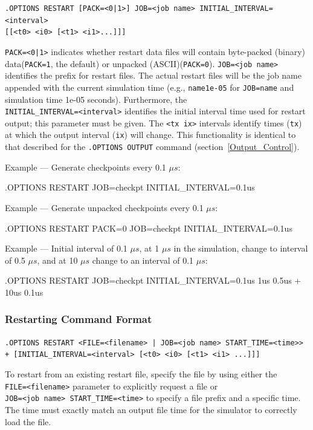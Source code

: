 \begin{XyceItemize}
\item \verb+.OPTIONS RESTART [PACK=<0|1>] JOB=<job name> INITIAL_INTERVAL=<interval>+ \\
  \verb+[[<t0> <i0> [<t1> <i1>...]]]+

  \texttt{PACK=<0|1>} indicates whether restart data files will contain byte-packed (binary) data(\texttt{PACK=1}, the default) or unpacked (ASCII)(\texttt{PACK=0}).
  \texttt{JOB=<job name>} identifies the prefix for restart files.  The actual restart files will be the job name appended with the current simulation time (e.g., \texttt{name1e-05} for \texttt{JOB=name} and simulation time 1e-05 seconds).  Furthermore, the\\ \texttt{INITIAL\_INTERVAL=<interval>} identifies the initial interval time used for restart output; this parameter must be given.  The \texttt{<tx ix>} intervals identify times (\texttt{tx}) at which the output interval (\texttt{ix}) will change.  This functionality is identical to that described for the 
  \texttt{.OPTIONS OUTPUT} command (section~\ref{Output_Control}).
\item Example --- Generate checkpoints every 0.1 $\mu s$:
\begin{vquote}
.OPTIONS RESTART JOB=checkpt INITIAL_INTERVAL=0.1us
\end{vquote}
\item Example --- Generate unpacked checkpoints every 0.1 $\mu s$:
\begin{vquote}
.OPTIONS RESTART PACK=0 JOB=checkpt INITIAL_INTERVAL=0.1us
\end{vquote}
\item Example --- Initial interval of 0.1 $\mu s$, at 1 $\mu s$ in the
  simulation, change to interval of 0.5 $\mu s$, and at 10 $\mu s$ change to an
  interval of 0.1 $\mu s$:
\begin{vquote}
.OPTIONS RESTART JOB=checkpt INITIAL_INTERVAL=0.1us 1us 0.5us
+ 10us 0.1us
\end{vquote}
\end{XyceItemize}

\subsubsection{Restarting Command Format}

\begin{XyceItemize}
\item {}
\verb+.OPTIONS RESTART <FILE=<filename> | JOB=<job name> START_TIME=<time>>+ \\
\verb|+ [INITIAL_INTERVAL=<interval> [<t0> <i0> [<t1> <i1> ...]]]|
\end{XyceItemize}
To restart from an existing restart file, specify the file by using either the\\%
\texttt{FILE=<filename>} parameter to explicitly request a file or\\%
\texttt{JOB=<job name> START\_TIME=<time>} to specify a file prefix and a
specific time.  The time must exactly match an output file time for the
simulator to correctly load the file.  

